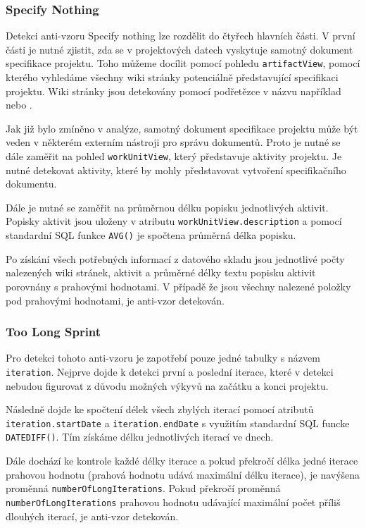 \documentclass[czech,DP]{thesiskiv}
\begin{document}
\subsubsection{Specify Nothing}
Detekci anti-vzoru Specify nothing lze rozdělit do čtyřech hlavních části. V první části je nutné zjistit, zda se v projektových datech vyskytuje samotný dokument specifikace projektu. Toho můžeme docílit pomocí pohledu \texttt{artifactView}, pomocí kterého vyhledáme všechny wiki stránky potenciálně představující specifikaci projektu. Wiki stránky jsou detekovány pomocí podřetězce v názvu například  nebo .
\par
Jak již bylo zmíněno v analýze, samotný dokument specifikace projektu může být veden v některém externím nástroji pro správu dokumentů. Proto je nutné se dále zaměřit na pohled \texttt{workUnitView}, který představuje aktivity projektu. Je nutné detekovat aktivity, které by mohly představovat vytvoření specifikačního dokumentu.
\par
Dále je nutné se zaměřit na průměrnou délku popisku jednotlivých aktivit. Popisky aktivit jsou uloženy v atributu \texttt{workUnitView.description} a pomocí standardní SQL funkce \texttt{AVG()} je spočtena průměrná délka popisku.
\par
Po získání všech potřebných informací z datového skladu jsou jednotlivé počty nalezených wiki stránek, aktivit a průměrné délky textu popisku aktivit porovnány s prahovými hodnotami. V případě že jsou všechny nalezené položky pod prahovými hodnotami, je anti-vzor detekován.
\subsubsection{Too Long Sprint}
Pro detekci tohoto anti-vzoru je zapotřebí pouze jedné tabulky s názvem \texttt{iteration}. Nejprve dojde k detekci první a poslední iterace, které v detekci nebudou figurovat z důvodu možných výkyvů na začátku a konci projektu.
\par
Následně dojde ke spočtení délek všech zbylých iterací pomocí atributů \texttt{iteration.startDate} a \texttt{iteration.endDate} s využitím standardní SQL funcke \texttt{DATEDIFF()}. Tím získáme délku jednotlivých iterací ve dnech.
\par
Dále dochází ke kontrole každé délky iterace a pokud překročí délka jedné iterace prahovou hodnotu (prahová hodnotu udává maximální délku iterace), je navýšena proměnná \texttt{numberOfLongIterations}. Pokud překročí proměnná \texttt{numberOfLongIterations} prahovou hodnotu udávající maximální počet příliš dlouhých iterací, je anti-vzor detekován.
\end{document}
